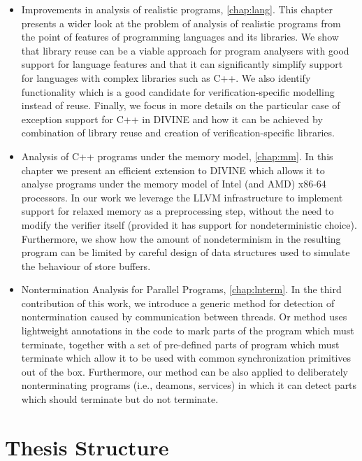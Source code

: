 \begin{itemize}
  \item Improvements in analysis of realistic programs, \autoref{chap:lang}.
    This chapter presents a wider look at the problem of analysis of realistic
    programs from the point of features of programming languages and its
    libraries.
    We show that library reuse can be a viable approach for program analysers
    with good support for language features and that it can significantly
    simplify support for languages with complex libraries such as C++.
    We also identify functionality which is a good candidate for
    verification-specific modelling instead of reuse.
    Finally, we focus in more details on the particular case of exception
    support for C++ in DIVINE and how it can be achieved by combination of
    library reuse and creation of verification-specific libraries.

  \item Analysis of C++ programs under the \xtso memory model, \autoref{chap:mm}.
    In this chapter we present an efficient extension to DIVINE which allows it to
    analyse programs under the memory model of Intel (and AMD) x86-64
    processors.
    In our work we leverage the LLVM infrastructure to implement support for
    relaxed memory as a preprocessing step, without the need to modify the
    verifier itself (provided it has support for nondeterministic choice).
    Furthermore, we show how the amount of nondeterminism in the resulting
    program can be limited by careful design of data structures used to
    simulate the behaviour of \xtso store buffers.

  \item Nontermination Analysis for Parallel Programs, \autoref{chap:lnterm}.
    In the third contribution of this work, we introduce a generic method for
    detection of nontermination caused by communication between threads.
    Or method uses lightweight annotations in the code to mark parts of the
    program which must terminate, together with a set of pre-defined parts of
    program which must terminate which allow it to be used with common
    synchronization primitives out of the box.
    Furthermore, our method can be also applied to deliberately nonterminating
    programs (i.e., deamons, services) in which it can detect parts which
    should terminate but do not terminate.
\end{itemize}

\section{Thesis Structure}

